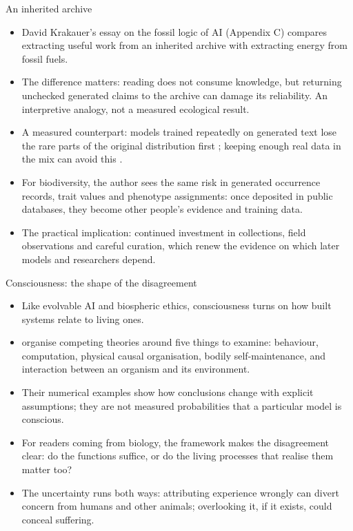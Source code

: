 \documentclass[11pt,aspectratio=169]{beamer}
\begin{document}
\begin{frame}{An inherited archive}
  \begin{itemize}
    \item David Krakauer's essay on the fossil logic of AI (Appendix C)
      compares extracting useful work from an inherited archive with
      extracting energy from fossil fuels.
    \item The difference matters: reading does not consume knowledge, but
      returning unchecked generated claims to the archive can damage its
      reliability. An interpretive analogy, not a measured ecological result.
    \item A measured counterpart: models trained repeatedly on generated text
      lose the rare parts of the original distribution first
      \parencite{shumailov2024collapse}; keeping enough real data in the mix
      can avoid this \parencite{seddik2024collapse}.
    \item For biodiversity, the author sees the same risk in generated
      occurrence records, trait values and phenotype assignments: once
      deposited in public databases, they become other people's evidence and
      training data.
    \item The practical implication: continued investment in collections,
      field observations and careful curation, which renew the evidence on
      which later models and researchers depend.
  \end{itemize}
\end{frame}

\begin{frame}{Consciousness: the shape of the disagreement}
  \begin{itemize}
    \item Like evolvable AI and biospheric ethics, consciousness turns on how
      built systems relate to living ones.
    \item \textcite{chandaria2026consciousness} organise competing theories
      around five things to examine: behaviour, computation, physical causal
      organisation, bodily self-maintenance, and interaction between an
      organism and its environment.
    \item Their numerical examples show how conclusions change with explicit
      assumptions; they are not measured probabilities that a particular model
      is conscious.
    \item For readers coming from biology, the framework makes the
      disagreement clear: do the functions suffice, or do the living processes
      that realise them matter too?
    \item The uncertainty runs both ways: attributing experience wrongly can
      divert concern from humans and other animals; overlooking it, if it
      exists, could conceal suffering.
  \end{itemize}
\end{frame}
\end{document}
